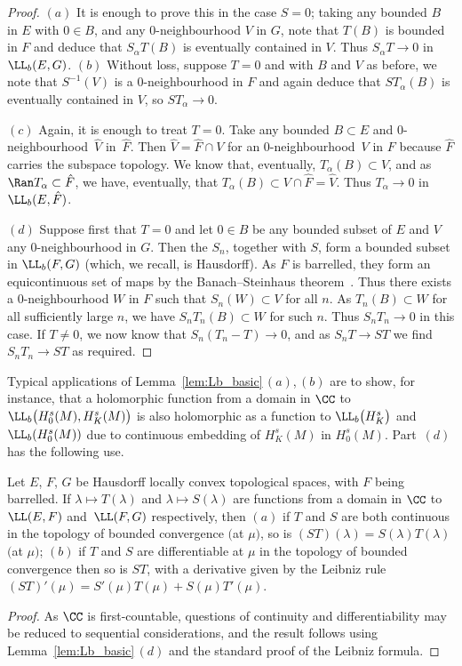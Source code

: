  \begin{proof}
 	$(a)$ It is enough to prove this in the case $S=0$; taking any bounded $B$ in $E$ with $0\in B$, and any $0$-neighbourhood $V$ in $G$, note that $T(B)$ is bounded in $F$ and deduce that $S_\alpha T(B)$ is eventually contained in $V$. Thus $S_\alpha T\to 0$ in $\LL_b(E,G)$. $(b)$ Without loss, suppose $T=0$ and with $B$ and $V$ as before, we note that $S^{-1}(V)$ is a $0$-neighbourhood in $F$ and again deduce that $ST_\alpha(B)$ is eventually contained in $V$, so $ST_\alpha\to 0$.
 	
 	$(c)$ Again, it is enough to treat $T=0$. Take any bounded $B\subset E$ and $0$-neighbourhood~$\hat{V}$ in~$\hat{F}$. Then $\hat{V}=\hat{F}\cap V$ for an $0$-neighbourhood~$V$ in $F$ because $\hat{F}$ carries the subspace topology. We know that, eventually, $T_\alpha(B)\subset V$, and as $\Ran T_\alpha\subset \hat{F}$, we have, eventually, that $T_\alpha(B)\subset V\cap\hat{F}= \hat{V}$. Thus $T_\alpha\to 0$ in $\LL_b(E,\hat{F})$.
 	
 	$(d)$ Suppose first that $T=0$ and let $0\in B$
 	be any bounded subset of $E$ and $V$ any $0$-neighbourhood in $G$. Then
 	the $S_n$, together with $S$, form a bounded subset in $\LL_b(F,G)$ (which, we recall, is Hausdorff). As $F$ is barrelled, they form an equicontinuous set of maps by the Banach--Steinhaus theorem~\cite[Theorem 33.1]{Treves:TVS}. Thus there exists
 	a $0$-neighbourhood $W$ in $F$ such that $S_n (W)\subset V$ for all $n$.
 	As $T_n(B)\subset W$ for all sufficiently large $n$, we have $S_nT_n(B)\subset W$ for such $n$. Thus $S_nT_n\to 0$ in this case. If $T\neq 0$, we now know
 	that $S_n(T_n-T)\to 0$, and as $S_n T\to ST$ we find $S_nT_n\to ST$ as required.
 \end{proof}

 Typical applications of Lemma~\ref{lem:Lb_basic}\,$(a)$,\,$(b)$ are to show, for instance, that a holomorphic function from a domain in $\CC$ to $\LL_b\big(H^s_0(M),H^s_K(M)\big)$ is also holomorphic as a function to $\LL_b\big(H^s_K\big)$ and
 $\LL_b(H^s_0(M))$ due to continuous embedding of $H_K^s(M)$ in $H^s_0(M)$. Part~$(d)$ has the following use.
 \begin{Corollary}\label{cor:Leibniz}
 	Let $E$, $F$, $G$ be Hausdorff locally convex topological spaces, with $F$ being barrelled.
 	If $\lambda\mapsto T(\lambda)$ and $\lambda\mapsto S(\lambda)$ are functions from a domain in $\CC$ to~$\LL(E,F)$ and~$\LL(F,G)$ respectively, then $(a)$ if $T$ and $S$ are both continuous in the topology of bounded convergence $($at $\mu$$)$, so is $(ST)(\lambda)=S(\lambda)T(\lambda)$ $($at $\mu$$)$; $(b)$ if $T$ and $S$ are differentiable at $\mu$ in the topology of bounded convergence then so is $ST$, with a derivative given by the Leibniz rule
 	$(ST)'(\mu)=S'(\mu)T(\mu) + S(\mu)T'(\mu)$.
 \end{Corollary}
 \begin{proof}
 	As $\CC$ is first-countable, questions of continuity and differentiability may be reduced to sequential considerations, and the result follows using Lemma~\ref{lem:Lb_basic}\,$(d)$ and the standard proof of the Leibniz formula.
 \end{proof}

